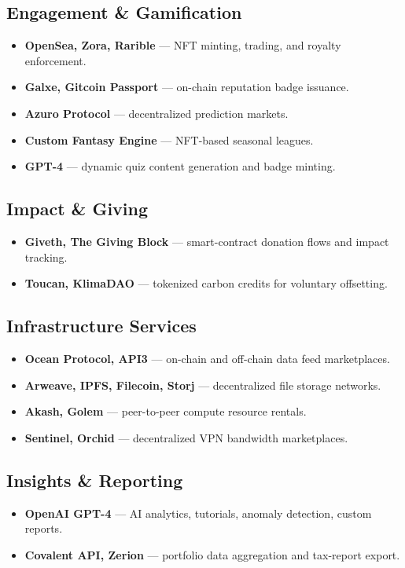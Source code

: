 \documentclass[13pt]{extarticle}
\begin{document}
\subsection{Engagement \& Gamification}
\begin{itemize}[left=1em]
  \item \textbf{OpenSea, Zora, Rarible} — NFT minting, trading, and royalty enforcement.  
  \item \textbf{Galxe, Gitcoin Passport} — on-chain reputation badge issuance.  
  \item \textbf{Azuro Protocol} — decentralized prediction markets.  
  \item \textbf{Custom Fantasy Engine} — NFT-based seasonal leagues.  
  \item \textbf{GPT-4} — dynamic quiz content generation and badge minting.
\end{itemize}

\subsection{Impact \& Giving}
\begin{itemize}[left=1em]
  \item \textbf{Giveth, The Giving Block} — smart-contract donation flows and impact tracking.  
  \item \textbf{Toucan, KlimaDAO} — tokenized carbon credits for voluntary offsetting.
\end{itemize}

\subsection{Infrastructure Services}
\begin{itemize}[left=1em]
  \item \textbf{Ocean Protocol, API3} — on-chain and off-chain data feed marketplaces.  
  \item \textbf{Arweave, IPFS, Filecoin, Storj} — decentralized file storage networks.  
  \item \textbf{Akash, Golem} — peer-to-peer compute resource rentals.  
  \item \textbf{Sentinel, Orchid} — decentralized VPN bandwidth marketplaces.
\end{itemize}

\subsection{Insights \& Reporting}
\begin{itemize}[left=1em]
  \item \textbf{OpenAI GPT-4} — AI analytics, tutorials, anomaly detection, custom reports.  
  \item \textbf{Covalent API, Zerion} — portfolio data aggregation and tax-report export.
\end{itemize}
\end{document}
